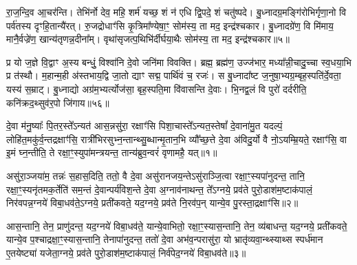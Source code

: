 रा॒ज॒न्दि॒व आ॒चर॑न्ति। तेभि॑र्नो देव॒ महि॒ शर्म॑ यच्छ॒ शं न॑ एधि द्वि॒पदे॒ शं चतु॑ष्पदे। बु॒ध्नादग्र॒मङ्गि॑रोभिर्गृणा॒नो वि पर्व॑तस्य दृꣳहि॒तान्यै॑रत्। रु॒जद्रोधाꣳ॑सि कृ॒त्रिमा᳚ण्येषा॒ꣳ॒ सोम॑स्य॒ ता मद॒ इन्द्र॑श्चकार। बु॒ध्नादग्रे॑ण॒ वि मि॑माय॒ मानै॒र्वज्रे॑ण॒ खान्य॑तृणन्न॒दीना᳚म्। वृथा॑सृजत्प॒थिभि॑र्दीर्घया॒थैः सोम॑स्य॒ ता मद॒ इन्द्र॑श्चकार॥५॥

प्र यो ज॒ज्ञे वि॒द्वाꣳ अ॒स्य बन्धुं॒ विश्वा॑नि दे॒वो जनि॑मा विवक्ति। ब्रह्म॒ ब्रह्म॑ण॒ उज्ज॑भार॒ मध्या᳚न्नी॒चादु॒च्चा स्व॒धया॒भि प्र त॑स्थौ। म॒हान्म॒ही अ॑स्तभाय॒द्वि जा॒तो द्याꣳ सद्म॒ पार्थि॑वं च॒ रजः॑। स बु॒ध्नादा᳚ष्ट ज॒नुषा॒भ्यग्र॒म्बृह॒स्पति॑र्दे॒वता॒ यस्य॑ स॒म्राट्। बु॒ध्नाद्यो अग्र॑म॒भ्यर्त्योज॑सा॒ बृह॒स्पति॒मा वि॑वासन्ति दे॒वाः। भि॒नद्व॒लं वि पुरो॑ दर्दरीति॒ कनि॑क्रद॒थ्सुव॑र॒पो जि॑गाय॥५६॥

{\anuvakamend[{यु॒वं वी॒तमा॒ विवा॑सति॒ पन्था॑नो दीर्घया॒थैः सोम॑स्य॒ ता मद॒ इन्द्र॑श्चकार दे॒वा नव॑ च॥14॥}]}


{}

\setcounter{anuvakam}{0}
दे॒वा म॑नु॒ष्याः᳚ पि॒तर॒स्ते᳚\-ऽन्यत॑ आस॒न्नसु॑रा॒ रक्षाꣳ॑सि पिशा॒चास्ते᳚\-ऽन्यत॒स्तेषां᳚ दे॒वाना॑मु॒त यदल्पं॒ लोहि॑त॒मकु॑र्व॒न्तद्रक्षाꣳ॑सि॒ रात्री॑भिरसुभ्न॒न्तान्थ्सु॒ब्धान्मृ॒तान॒भि व्यौ᳚च्छ॒त्ते दे॒वा अ॑विदु॒र्यो वै नो॒\-ऽयम्म्रि॒यते॒ रक्षाꣳ॑सि॒ वा इ॒मं घ्न॒न्तीति॒ ते रक्षा॒ꣳ॒स्युपा॑मन्त्रयन्त॒ तान्य॑ब्रुव॒न्वरं॑ वृणामहै॒ यत्॥१॥

असु॑रा॒ञ्जया॑म॒ तन्नः॑ स॒हास॒दिति॒ ततो॒ वै दे॒वा असु॑रानजय॒न्ते\-ऽसु॑राञ्जि॒त्वा रक्षा॒ꣳ॒स्यपा॑नुदन्त॒ तानि॒ रक्षा॒ꣳ॒स्यनृ॑तमक॒र्तेति॑ सम॒न्तं दे॒वान्पर्य॑विश॒न्ते दे॒वा अ॒ग्नाव॑नाथन्त॒ ते᳚\-ऽग्नये॒ प्रव॑ते पुरो॒डाश॑म॒ष्टाक॑पालं॒ निर॑वपन्न॒ग्नये॑ विबा॒धव॑ते॒\-ऽग्नये॒ प्रती॑कवते॒ यद॒ग्नये॒ प्रव॑ते नि॒रव॑प॒न् यान्ये॒व पु॒रस्ता॒द्रक्षाꣳ॑सि॥२॥

आस॒न्तानि॒ तेन॒ प्राणु॑दन्त॒ यद॒ग्नये॑ विबा॒धव॑ते॒ यान्ये॒वाभितो॒ रक्षा॒ꣳ॒स्यास॒न्तानि॒ तेन॒ व्य॑बाधन्त॒ यद॒ग्नये॒ प्रती॑कवते॒ यान्ये॒व प॒श्चाद्रक्षा॒ꣳ॒स्यास॒न्तानि॒ तेनापा॑नुदन्त॒ ततो॑ दे॒वा अभ॑व॒न्परासु॑रा॒ यो भ्रातृ॑व्यवा॒न्थ्स्याथ्स स्पर्ध॑मान ए॒तयेष्ट्या॑ यजेता॒ग्नये॒ प्रव॑ते पुरो॒डाश॑म॒ष्टाक॑पालं॒ निर्व॑पेद॒ग्नये॑ विबा॒धव॑ते॥३॥

